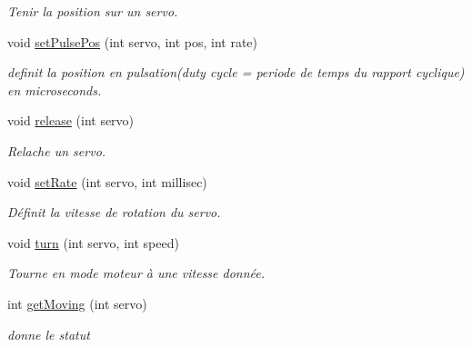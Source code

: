 \begin{DoxyCompactItemize}
\begin{DoxyCompactList}\small\item\em Tenir la position sur un servo. \end{DoxyCompactList}\item 
\mbox{\label{classServoDriver_a054705e6b04674b45aa9dd39e68a1b1c}} 
void \hyperlink{classServoDriver_a054705e6b04674b45aa9dd39e68a1b1c}{set\+Pulse\+Pos} (int servo, int pos, int rate)
\begin{DoxyCompactList}\small\item\em definit la position en pulsation(duty cycle = periode de temps du rapport cyclique) en microseconds. \end{DoxyCompactList}\item 
\mbox{\label{classServoDriver_aa1040b0db7ed851aec70a122301fe665}} 
void \hyperlink{classServoDriver_aa1040b0db7ed851aec70a122301fe665}{release} (int servo)
\begin{DoxyCompactList}\small\item\em Relache un servo. \end{DoxyCompactList}\item 
\mbox{\label{classServoDriver_a27d45f075f5fb2333937ab253a8cce6c}} 
void \hyperlink{classServoDriver_a27d45f075f5fb2333937ab253a8cce6c}{set\+Rate} (int servo, int millisec)
\begin{DoxyCompactList}\small\item\em Définit la vitesse de rotation du servo. \end{DoxyCompactList}\item 
\mbox{\label{classServoDriver_ad68ebde8a710451c8fea2cd03cfa4bc0}} 
void \hyperlink{classServoDriver_ad68ebde8a710451c8fea2cd03cfa4bc0}{turn} (int servo, int speed)
\begin{DoxyCompactList}\small\item\em Tourne en mode moteur à une vitesse donnée. \end{DoxyCompactList}\item 
int \hyperlink{classServoDriver_a0a8e84f0bbcff39549ddfc239f1a6237}{get\+Moving} (int servo)
\begin{DoxyCompactList}\small\item\em donne le statut \end{DoxyCompactList}\item 

\end{DoxyCompactItemize}
